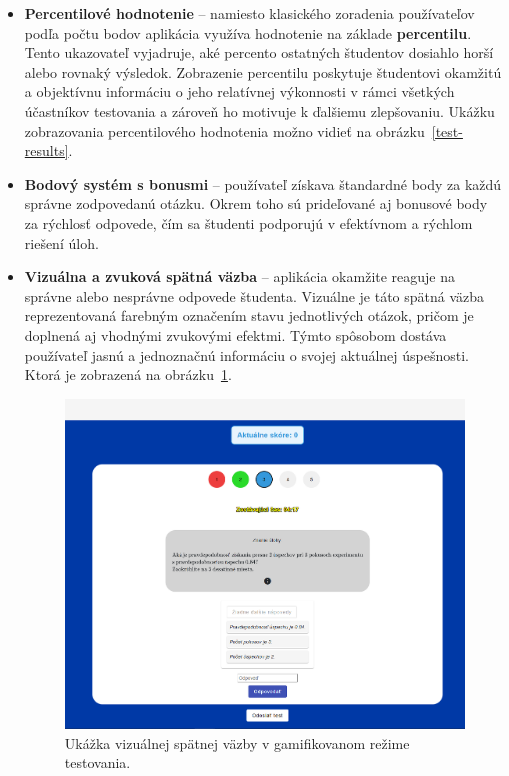 \begin{itemize} \item \textbf{Percentilové hodnotenie} – namiesto klasického zoradenia používateľov podľa počtu bodov aplikácia využíva hodnotenie na základe \textbf{percentilu}. 
  Tento ukazovateľ vyjadruje, aké percento ostatných študentov dosiahlo horší alebo rovnaký výsledok.
   Zobrazenie percentilu poskytuje študentovi okamžitú a objektívnu informáciu o jeho relatívnej výkonnosti v rámci všetkých účastníkov testovania a zároveň ho motivuje k ďalšiemu zlepšovaniu.
  Ukážku zobrazovania percentilového hodnotenia možno vidieť na obrázku~\ref{test-results}.
  

\item \textbf{Bodový systém s bonusmi} – používateľ získava štandardné body za každú správne zodpovedanú otázku. 
Okrem toho sú prideľované aj bonusové body za rýchlosť odpovede, čím sa študenti podporujú v efektívnom a rýchlom riešení úloh.

\item \textbf{Vizuálna a zvuková spätná väzba} – aplikácia okamžite reaguje na správne alebo nesprávne odpovede študenta.
 Vizuálne je táto spätná väzba reprezentovaná farebným označením stavu jednotlivých otázok, pričom je doplnená aj vhodnými zvukovými efektmi. 
Týmto spôsobom dostáva používateľ jasnú a jednoznačnú informáciu o svojej aktuálnej úspešnosti. Ktorá je zobrazená na obrázku~\ref{gamification}.

\begin{figure}[H]
  \centering
  \includegraphics[width=14cm]{img/gamification.png}
  \caption{Ukážka vizuálnej spätnej väzby v gamifikovanom režime testovania.}
  \label{gamification}
\end{figure}


\end{itemize}
